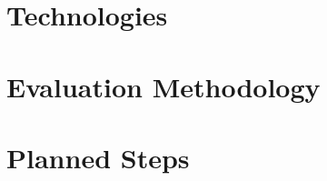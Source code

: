 \documentclass{article}
\begin{document}
\section{Technologies}
\label{sec:technologies}


\section{Evaluation Methodology}
\label{sec:evaluation_methodology}


\section{Planned Steps}
\label{sec:planned_steps}

\end{document}
